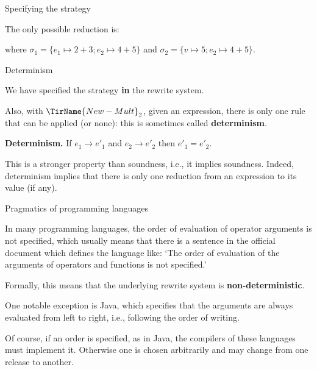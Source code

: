 \documentclass[compress,dvipdfmx]{beamer}
\newcommand{\Java}{\textsf{Java}\xspace}
\begin{document}
%
\begin{frame}{Specifying the strategy}

  The only possible reduction is:
  where \(\sigma_1=\{e_1 \mapsto 2+3; e_2 \mapsto 4+5\}\) and
  \(\sigma_2=\{v \mapsto 5; e_2 \mapsto 4+5\}\).

\end{frame}

%
\begin{frame}{Determinism}

  We have specified the strategy \textbf{in} the rewrite system.

  \bigskip

  Also, with \(\TirName{New-Mult}_2\), given an expression, there is
  only one rule that can be applied (or none): this is sometimes
  called \textbf{determinism}.

  \bigskip

  \textbf{Determinism.} If \(e_1 \rightarrow e'_1\) and \(e_2
  \rightarrow e'_2\) then \(e'_1 = e'_2\).

  \bigskip

  This is a stronger property than soundness, i.e., it implies
  soundness. Indeed, determinism implies that there is only one
  reduction from an expression to its value (if any).

\end{frame}

%
\begin{frame}{Pragmatics of programming languages}

  In many programming languages, the order of evaluation of operator
  arguments is not specified, which usually means that there is a
  sentence in the official document which defines the language like:
  `The order of evaluation of the arguments of operators and functions
  is not specified.'

  \bigskip

  Formally, this means that the underlying rewrite system is
  \textbf{non-deterministic}.

  \bigskip

  One notable exception is \Java, which specifies that the arguments
  are always evaluated from left to right, i.e., following the order
  of writing.

  \bigskip

  Of course, if an order is specified, as in \Java, the compilers of
  these languages must implement it. Otherwise one is chosen
  arbitrarily and may change from one release to another.

\end{frame}
\end{document}

